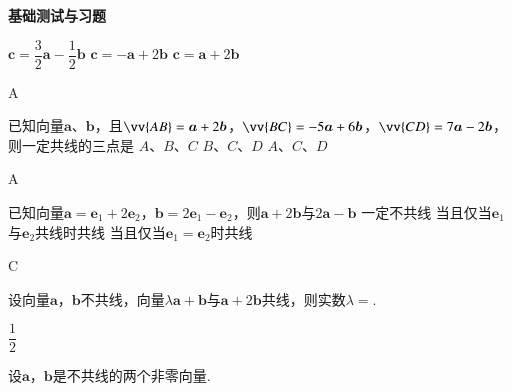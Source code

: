 \begin{exercise}{\textbf{基础测试与习题}}
      \begin{minipage}[b]{0.7\linewidth}
          {$\bm{c}=\dfrac32\bm{a}-\dfrac12\bm{b}$}
          {$\bm{c}=-\bm{a}+2\bm{b}$}
          {$\bm{c}=\bm{a}+2\bm{b}$}
      \end{minipage}\hfill
      \begin{minipage}[htbp!]{0.3\linewidth}
        \begin{center}
        \end{center}
      \end{minipage}
      \begin{answer}
        A
      \end{answer}
    \item%
      已知向量$\bm a$、$\bm b$，且$\vv{AB}=\bm a+2\bm b$，$\vv{BC}=-5\bm a+6\bm b$，$\vv{CD}=7\bm a-2\bm b$，则一定共线的三点是\xz
        {$A$、$B$、$C$}
        {$B$、$C$、$D$}
        {$A$、$C$、$D$}
      \begin{answer}
        A
      \end{answer}
    \item%
      已知向量$\bm a=\bm e_1+2\bm e_2$，$\bm b=2\bm e_1-\bm e_2$，则$\bm a+2\bm b$与$2\bm a-\bm b$\xz
        {一定不共线}
        {当且仅当$\bm e_1$与$\bm e_2$共线时共线}
        {当且仅当$\bm e_1=\bm e_2$时共线}
      \begin{answer}
        C
      \end{answer}
    \item
      设向量$\bm a$，$\bm b$不共线，向量$\lambda\bm a+\bm b$与$\bm a+2\bm b$共线，则实数$\lambda=$\tk.
      \begin{answer}
        $\dfrac12$
      \end{answer}
    \vspace{2em}
    \item%
      设$\bm a$，$\bm b$是不共线的两个非零向量.\\

\end{exercise}
